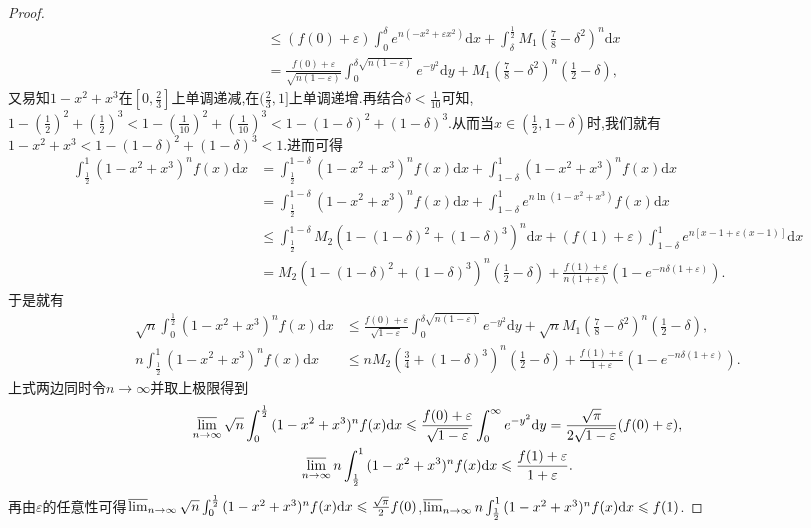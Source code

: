 \documentclass[../../main.tex]{subfiles}
\begin{document}
\begin{proof}
\begin{align*}
&\leqslant (f(0) + \varepsilon)\int_0^{\delta}{e^{n(-x^2 + \varepsilon x^2)}\mathrm{d}x}+\int_{\delta}^{\frac{1}{2}}{M_1\left(\frac{7}{8}-\delta^2\right)^n\mathrm{d}x}\\
&=\frac{f(0) + \varepsilon}{\sqrt{n(1 - \varepsilon)}}\int_0^{\delta\sqrt{n(1 - \varepsilon)}}{e^{-y^2}\mathrm{d}y}+M_1\left(\frac{7}{8}-\delta^2\right)^n\left(\frac{1}{2}-\delta\right),
\end{align*}
又易知$1-x^2+x^3$在$[0,\frac{2}{3}]$上单调递减,在$(\frac{2}{3},1]$上单调递增.再结合$\delta<\frac{1}{10}$可知,$1-(\frac{1}{2})^2+(\frac{1}{2})^3<1-(\frac{1}{10})^2+(\frac{1}{10})^3<1-(1-\delta)^2+(1-\delta)^3$.从而当$x\in (\frac{1}{2},1-\delta)$时,我们就有$1-x^2+x^3<1-(1-\delta)^2+(1-\delta)^3<1$.进而可得
\begin{align*}
\int_{\frac{1}{2}}^1{(1 - x^2 + x^3)^nf(x)\mathrm{d}x}&=\int_{\frac{1}{2}}^{1 - \delta}{(1 - x^2 + x^3)^nf(x)\mathrm{d}x}+\int_{1 - \delta}^1{(1 - x^2 + x^3)^nf(x)\mathrm{d}x}\\
&=\int_{\frac{1}{2}}^{1 - \delta}{(1 - x^2 + x^3)^nf(x)\mathrm{d}x}+\int_{1 - \delta}^1{e^{n\ln(1 - x^2 + x^3)}f(x)\mathrm{d}x}\\
&\leqslant \int_{\frac{1}{2}}^{1 - \delta}{M_2\left(1-(1-\delta)^2+(1 - \delta)^3\right)^n\mathrm{d}x}+(f(1) + \varepsilon)\int_{1 - \delta}^1{e^{n[x - 1 + \varepsilon(x - 1)]}\mathrm{d}x}\\
&=M_2\left(1-(1-\delta)^2+(1 - \delta)^3\right)^n\left(\frac{1}{2}-\delta\right)+\frac{f(1) + \varepsilon}{n(1 + \varepsilon)}\left(1 - e^{-n\delta(1 + \varepsilon)}\right).
\end{align*}
于是就有
\begin{align*}
\sqrt{n}\int_0^{\frac{1}{2}}{(1 - x^2 + x^3)^nf(x)\mathrm{d}x}&\leqslant \frac{f(0) + \varepsilon}{\sqrt{1 - \varepsilon}}\int_0^{\delta\sqrt{n(1 - \varepsilon)}}{e^{-y^2}\mathrm{d}y}+\sqrt{n} M_1\left(\frac{7}{8}-\delta^2\right)^n\left(\frac{1}{2}-\delta\right),\\
n\int_{\frac{1}{2}}^1{(1 - x^2 + x^3)^nf(x)\mathrm{d}x}&\leqslant n M_2\left(\frac{3}{4}+(1 - \delta)^3\right)^n\left(\frac{1}{2}-\delta\right)+\frac{f(1) + \varepsilon}{1 + \varepsilon}\left(1 - e^{-n\delta(1 + \varepsilon)}\right).
\end{align*}
上式两边同时令\(n\rightarrow\infty\)并取上极限得到
\begin{gather*}
\varlimsup_{n\rightarrow\infty}\sqrt{n}\int_0^{\frac{1}{2}}{(1 - x^2 + x^3)^nf(x)\mathrm{d}x}\leqslant \frac{f(0) + \varepsilon}{\sqrt{1 - \varepsilon}}\int_0^{\infty}{e^{-y^2}\mathrm{d}y}=\frac{\sqrt{\pi}}{2\sqrt{1 - \varepsilon}}(f(0) + \varepsilon),\\
\varlimsup_{n\rightarrow\infty}n\int_{\frac{1}{2}}^1{(1 - x^2 + x^3)^nf(x)\mathrm{d}x}\leqslant \frac{f(1) + \varepsilon}{1 + \varepsilon}.
\end{gather*}
再由\(\varepsilon\)的任意性可得\(\varlimsup_{n\rightarrow\infty}\sqrt{n}\int_0^{\frac{1}{2}}{(1 - x^2 + x^3)^nf(x)\mathrm{d}x}\leqslant \frac{\sqrt{\pi}}{2}f(0)\),\(\varlimsup_{n\rightarrow\infty}n\int_{\frac{1}{2}}^1{(1 - x^2 + x^3)^nf(x)\mathrm{d}x}\leqslant f(1)\).


\end{proof}
\end{document}
